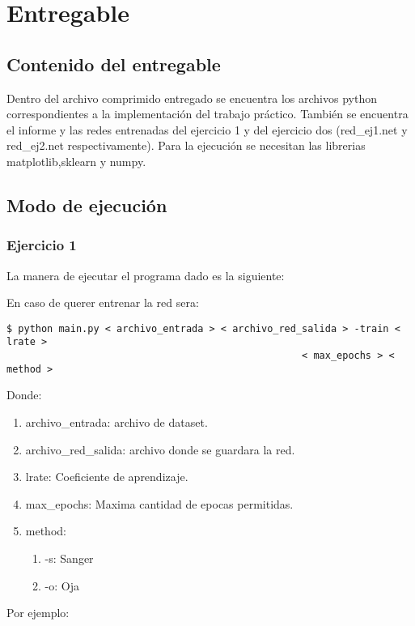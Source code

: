 \section{Entregable}
\subsection{Contenido del entregable}

Dentro del archivo comprimido entregado se encuentra los archivos python correspondientes a la implementaci\'on del trabajo pr\'actico. Tambi\'en se encuentra el informe y las redes entrenadas del ejercicio 1 y del ejercicio dos (red\_ej1.net y red\_ej2.net respectivamente).
Para la ejecuci\'on se necesitan las librerias matplotlib,sklearn y numpy. 
\subsection{Modo de ejecución}


\subsubsection{Ejercicio 1}


La manera de ejecutar el programa dado es la siguiente:

En caso de querer entrenar la red sera:

\begin{verbatim}
$ python main.py < archivo_entrada > < archivo_red_salida > -train < lrate > 
                                                   < max_epochs > < method >    
\end{verbatim}

Donde:

\begin{enumerate}
\item archivo\_entrada: archivo de dataset.
\item archivo\_red\_salida: archivo donde se guardara la red.
\item lrate: Coeficiente de aprendizaje.
\item max\_epochs: Maxima cantidad de epocas permitidas.
\item method: 
\begin{enumerate}
\item -s: Sanger
\item -o: Oja
\end{enumerate}
\end{enumerate}

Por ejemplo: 


